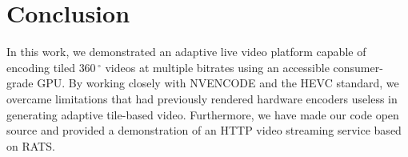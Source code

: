 



\section{Conclusion} \label{concl}

In this work, we demonstrated an adaptive live video platform capable of encoding tiled $360\,^{\circ}$ videos at multiple bitrates using an accessible consumer-grade GPU. By working closely with NVENCODE and the HEVC standard, we overcame limitations that had previously rendered hardware encoders useless in generating adaptive tile-based video. Furthermore, we have made our code open source and provided a demonstration of an HTTP video streaming service based on RATS.

